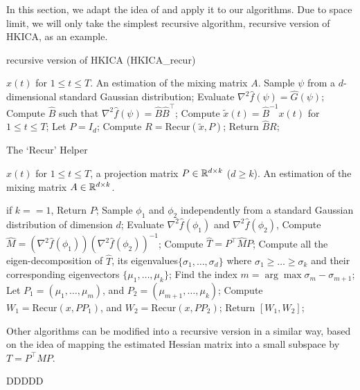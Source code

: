 In this section, we adapt the idea of \citet{vempala2014max} and apply it to our algorithms. Due to space limit, we will only take the simplest recursive algorithm, recursive version of HKICA, as an example.
\begin{algorithm} 
\caption{recursive version of HKICA (HKICA\_recur)}
\label{alg:HKICA_recur}
\begin{algorithmic}[1]
\INPUT $x(t)$ for $1\le t \le T$. 
\OUTPUT An estimation of the mixing matrix $A$. 
\STATE Sample $\psi$ from a $d$-dimensional standard Gaussian distribution;
\STATE Evaluate $\nabla^2\hat{f}(\psi) = \hat{G}(\psi)$; \\
\STATE Compute $\hat{B}$ such that $\nabla^2\hat{f}(\psi) = \hat{B}\hat{B}^{\top}$;
\STATE Compute $\tilde{x}(t) = \hat{B}^{-1}x(t)$ for $1\le t \le T$;
\STATE Let $P = I_d$;
\STATE Compute $R = \text{Recur}(\tilde{x}, P)$;
\STATE Return $\hat{B}R$;
\end{algorithmic}
\end{algorithm}
\begin{algorithm} 
\caption{The `Recur' Helper}
\label{alg:recur}
\begin{algorithmic}[1]
\INPUT $x(t)$ for $1\le t \le T$, a projection matrix $P\in \mathbb{R}^{d\times k}$ ($d\ge k$). 
\OUTPUT An estimation of the mixing matrix $A\in \mathbb{R}^{d\times k}$. 

\STATE if $k==1$, Return $P$;
\STATE Sample $\phi_1$ and $\phi_2$ independently from a standard Gaussian distribution of dimension $d$;
\STATE Evaluate $\nabla^2\hat{f}(\phi_1)$ and $\nabla^2\hat{f}(\phi_2)$, 
\STATE Compute $\hat{M} = (\nabla^2 \hat{f}(\phi_1))(\nabla^2\hat{f}(\phi_2))^{-1}$;
\STATE Compute $\hat{T} = P^{\top} \hat{M} P$;
\STATE Compute all the eigen-decomposition of $\hat{T}$, its eigenvalues$\{\sigma_1,\ldots,\sigma_d\}$ where $\sigma_1\ge\ldots\ge \sigma_k$ and their corresponding eigenvectors $\{\mu_1,\ldots, \mu_k\}$;
\STATE Find the index $m = \arg\max \sigma_m - \sigma_{m+1}$; 
\STATE Let $P_1 = (\mu_1,\ldots,\mu_m)$, and $P_2 = (\mu_{m+1},\ldots,\mu_k)$;
\STATE Compute $W_1 = \text{Recur} (x, PP_1)$, and  $W_2 = \text{Recur} (x, PP_2)$;
\STATE Return $[W_1,W_2]$;
\end{algorithmic}
\end{algorithm}

\begin{remark}
Other algorithms can be modified into a recursive version in a similar way, based on the idea of mapping the estimated Hessian matrix into a small subspace by $T = P^{\top}MP$. 
\end{remark}
\begin{thm}
\label{thm:recursiveAlg}
DDDDD
\end{thm} 